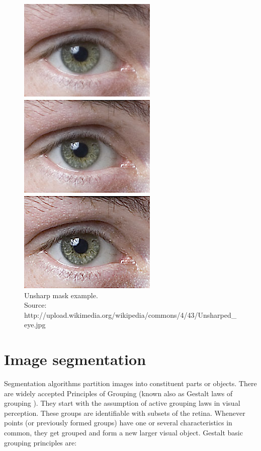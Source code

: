 \documentclass[a4paper,onecolumn,oneside,12pt]{memoir}
\begin{document}
\begin{figure}[ht]
\begin{center}
\includegraphics[scale=1.2]{images/unsharpMaskExample.jpg}
\caption{Unsharp mask example. \\
Source: http://upload.wikimedia.org/wikipedia/commons/4/43/Unsharped\_eye.jpg}
\label{unsharpMaskExample}
\end{center}
\end{figure}

\section{Image segmentation}

Segmentation algorithms partition images into constituent parts or objects. There are widely
accepted Principles of Grouping (known also as Gestalt laws of grouping \cite{gestaltTheory}).
They start with the assumption of active grouping laws in visual perception. These groups are
identifiable with subsets of the retina. Whenever points (or previously formed groups) have one or
several characteristics in common, they get grouped and form a new larger visual object. Gestalt
basic grouping principles are:
\end{document}
